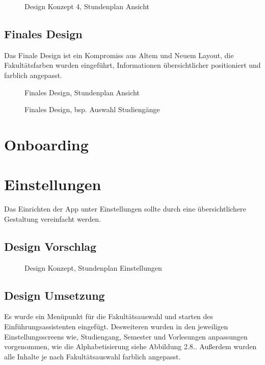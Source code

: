 \begin{figure}[H]
	\centering
	\caption{Design Konzept 4,  Stundenplan Ansicht}
	\label{fig1}
\end{figure}
\subsection{Finales Design}
Das Finale Design ist ein Kompromiss aus Altem und Neuem Layout, die Fakultätsfarben wurden eingeführt, Informationen übersichtlicher positioniert und farblich angepasst.

\begin{figure}[H]
	\centering
	\caption{Finales Design, Stundenplan Ansicht}
	\label{fig1}
\end{figure}

\begin{figure}[H]
	\centering
	\caption{Finales Design, bsp. Auswahl Studiengänge}
	\label{fig1}
\end{figure}




\section{Onboarding}

\section{Einstellungen}
Das Einrichten der App unter Einstellungen sollte durch eine übersichtlichere Gestaltung vereinfacht werden. 

\subsection{Design Vorschlag}

\begin{figure}[H]
	\centering
	\caption{Design Konzept, Stundenplan Einstellungen}
	\label{fig1}
\end{figure}

\subsection{Design Umsetzung}
Es wurde ein Menüpunkt für die Fakultätsauswahl und starten des Einführungsassistenten eingefügt. Desweiteren wurden in den jeweiligen Einstellungsscreens wie, Studiengang, Semester und Vorlesungen anpassungen vorgenommen, wie die Alphabetisierung siehe Abbildung 2.8.. Außerdem wurden alle Inhalte je nach Fakultätsauswahl farblich angepasst.


